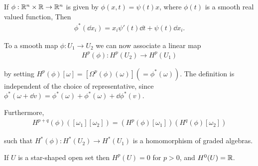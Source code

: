 \begin{example}\label{example:3-14}
If $\phi:\mathbb{R}^n\times\mathbb{R}\to\mathbb{R}^n$ is given by $\phi(x, t) = \psi(t)x$, where $\phi(t)$ is a smooth real 
valued function, Then 
\begin{align*}
  \phi^*(\dd x_i) = x_i \psi'(t)\dd t + \psi(t) \dd x_i.
\end{align*}

To a smooth map $\phi:U_1\to U_2$ we can now associate a linear map
\begin{align*}
  H^p(\phi): H^p(U_2) \to H^p(U_1)
\end{align*}

by setting $H^p(\phi)[\omega] = [\Omega^p(\phi)(\omega)] (=\phi^*(\omega))$. The definition is independent of the
choice of representative, since $\phi^*(\omega+\dd v) = \phi^*(\omega) + \phi^*(\omega) + \dd\phi^*(v)$. 

Furthermore,
\begin{align*}
  H^{p+q}(\phi)([\omega_1][\omega_2]) = (H^p(\phi)[\omega_1])(H^q(\phi)[\omega_2]) 
\end{align*}

such that $H^*(\phi):H^*(U_2)\to H^*(U_1)$ is a homomorphism of graded algebras.
\end{example}

\begin{theorem}\label{theorem:3-15}
If $U$ is a star-shaped open set then $H^p(U) = 0$ for $p > 0$, and $H^0(U) = \mathbb{R}$.
\end{theorem}

